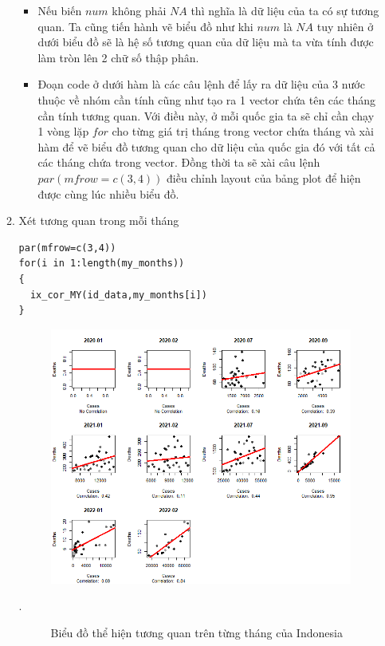 \documentclass[a4paper]{article}
\theoremstyle{definition}
\begin{document}
\begin{enumerate}[i)]
\begin{enumerate}[1)]
\begin{itemize}
    \item Nếu biến $num$ không phải $NA$ thì nghĩa là dữ liệu của ta có sự tương quan. Ta cũng tiến hành vẽ biểu đồ như khi $num$ là $NA$ tuy nhiên ở dưới biểu đồ sẽ là hệ số tương quan của dữ liệu mà ta vừa tính được làm tròn lên 2 chữ số thập phân.
    \item Đoạn code ở dưới hàm là các câu lệnh để lấy ra dữ liệu của 3 nước thuộc về nhóm cần tính cũng như tạo ra 1 vector chứa tên các tháng cần tính tương quan. Với điều này, ở mỗi quốc gia ta sẽ chỉ cần chạy 1 vòng lặp $for$ cho từng giá trị tháng trong vector chứa tháng và xài hàm để vẽ biểu đồ tương quan cho dữ liệu của quốc gia đó với tất cả các tháng chứa trong vector. Đồng thời ta sẽ xài câu lệnh $par(mfrow=c(3,4))$ điều chỉnh layout của bảng plot để hiện được cùng lúc nhiều biểu đồ.
\end{itemize}

\newpage
        \item Xét tương quan trong mỗi tháng
        \lstset{
    title=Source code for Indonesia}
\begin{lstlisting}[frame=single]  
par(mfrow=c(3,4))
for(i in 1:length(my_months))
{
  ix_cor_MY(id_data,my_months[i])
}
\end{lstlisting}
\begin{figure}[h!]
	\begin{center}
	    \includegraphics[scale=0.8]{Images/IV/Indo.png}
        \label{fig:my_label}
	\end{center}
\end{figure}.
\begin{figure}[h!]
    \begin{center}
	    \caption{Biểu đồ thể hiện tương quan trên từng tháng của Indonesia}
	\end{center}
\end{figure}


\end{enumerate}
\end{enumerate}
\end{document}
